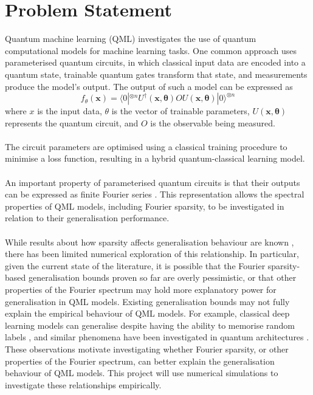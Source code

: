 
\section{Problem Statement}
\label{sec:ProblemStatement}

\large{\raggedright
Quantum machine learning (QML) investigates the use of quantum computational models for machine learning tasks. One common approach uses parameterised quantum circuits, in which classical input data are encoded into a quantum state, trainable quantum gates transform that state, and measurements produce the model's output. The output of such a model can be expressed as
\begin{equation}
    f_{\theta}(\bm{x}) = \langle 0|^{\otimes n} U^{\dagger}(\bm{x},\bm{\theta}) O U(\bm{x},\bm{\theta}) |0 \rangle^{\otimes n}
\end{equation}
where $x$ is the input data, $\theta$ is the vector of trainable parameters, $U(\bm{x},\bm{\theta})$ represents the quantum circuit, and $O$ is the observable being measured.\\
~\\
The circuit parameters are optimised using a classical training procedure to minimise a loss function, resulting in a hybrid quantum-classical learning model.\\
~\\
An important property of parameterised quantum circuits is that their outputs can be expressed as finite Fourier series \cite{Schuld21}. This representation allows the spectral properties of QML models, including Fourier sparsity, to be investigated in relation to their generalisation performance.\\
~\\
While results about how sparsity affects generalisation behaviour are known \cite{Caro21}, there has been limited numerical exploration of this relationship. In particular, given the current state of the literature, it is possible that the Fourier sparsity-based generalisation bounds proven so far are overly pessimistic, or that other properties of the Fourier spectrum may hold more explanatory power for generalisation in QML models. Existing generalisation bounds may not fully explain the empirical behaviour of QML models. For example, classical deep learning models can generalise despite having the ability to memorise random labels \cite{Zhang16, Zhang21}, and similar phenomena have been investigated in quantum architectures \cite{GilFuster24}. These observations motivate investigating whether Fourier sparsity, or other properties of the Fourier spectrum, can better explain the generalisation behaviour of QML models. This project will use numerical simulations to investigate these relationships empirically.
\par
}
